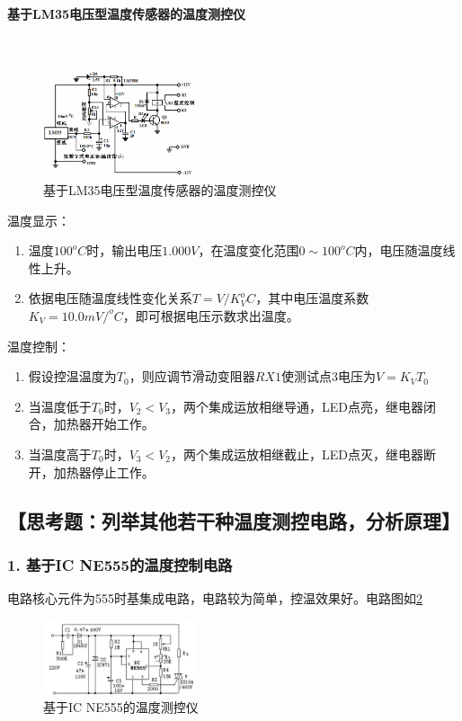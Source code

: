 \documentclass[12pt,a4paper,UTF8]{ctexart}
\begin{document}
    \paragraph{基于LM35电压型温度传感器的温度测控仪}~
    \newline
    \indent
    \begin{figure}[htbp]
        \centering
        \includegraphics[width=0.4\textwidth]{attachments/illus-4.png}
        \caption{基于LM35电压型温度传感器的温度测控仪}
        \label{fig:illus-4}
    \end{figure}
    温度显示：
    \begin{enumerate}[label=\arabic*.]
        \item 温度$100^oC$时，输出电压$1.000V$，在温度变化范围$0 \sim 100^oC$内，电压随温度线性上升。
		\item 依据电压随温度线性变化关系$T = V/K_V ^oC$，其中电压温度系数$K_V = 10.0 mV/^oC$，即可根据电压示数求出温度。
	\end{enumerate}
    温度控制：
    \begin{enumerate}[label=\arabic*.]
		\item 假设控温温度为$T_0$，则应调节滑动变阻器$RX1$使测试点3电压为$V = K_VT_0$
		\item 当温度低于$T_0$时，$V_2 < V_3$，两个集成运放相继导通，LED点亮，继电器闭合，加热器开始工作。
        \item 当温度高于$T_0$时，$V_3 < V_2$，两个集成运放相继截止，LED点灭，继电器断开，加热器停止工作。
	\end{enumerate}
\subsection*{【思考题：列举其他若干种温度测控电路，分析原理】}
    \subsubsection*{1. 基于IC NE555的温度控制电路}
        电路核心元件为555时基集成电路，电路较为简单，控温效果好。电路图如\ref{fig:illus-5}
        \begin{figure}[htbp]
            \centering
            \includegraphics[width=0.4\textwidth]{attachments/illus-5.png}
            \caption{基于IC NE555的温度测控仪}
            \label{fig:illus-5}
        \end{figure}
\end{document}
